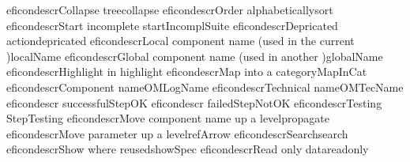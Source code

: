 \begin{gdreficon}
  \jb{}eficondescr{Collapse tree}{collapse}
  \jb{}eficondescr{Order alphabetically}{sort}
  \jb{}eficondescr{Start incomplete \gdsuite{}}{startIncomplSuite}
  \jb{}eficondescr{Depricated action}{depricated}
  \jb{}eficondescr{Local component name (used in the current \gdcase{})}{localName}
  \jb{}eficondescr{Global component name (used in another \gdcase{})}{globalName}
  \jb{}eficondescr{Highlight in \gdaut{}}{highlight}
  \jb{}eficondescr{Map into a category}{MapInCat}
  \jb{}eficondescr{Component name}{OMLogName}
  \jb{}eficondescr{Technical name}{OMTecName}
  \jb{}eficondescr{\gdstep{} successful}{StepOK}
  \jb{}eficondescr{\gdstep{} failed}{StepNotOK}
  \jb{}eficondescr{Testing \gdstep{}}{StepTesting}
  \jb{}eficondescr{Move component name up a level}{propagate}
  \jb{}eficondescr{Move parameter up a level}{refArrow}
  \jb{}eficondescr{Search}{search}
  \jb{}eficondescr{Show where reused}{showSpec}
  \jb{}eficondescr{Read only data}{readonly}
\end{gdreficon}
